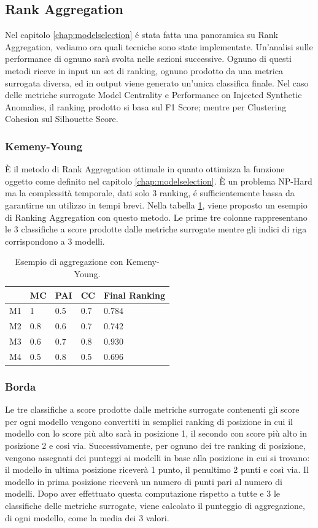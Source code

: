 \subsection{Rank Aggregation}
Nel capitolo \ref{chap:modelselection} é stata fatta una panoramica su Rank Aggregation, vediamo ora quali tecniche sono state implementate. Un'analisi sulle performance di ognuno sarà svolta nelle sezioni successive.
Ognuno di questi metodi riceve in input un set di ranking, ognuno prodotto da una metrica surrogata diversa, ed in output viene generato un'unica classifica finale.
Nel caso delle metriche surrogate Model Centrality e Performance on Injected Synthetic Anomalies, il ranking prodotto si basa sul F1 Score; mentre per Clustering Cohesion sul Silhouette Score.
\subsubsection{Kemeny-Young}
È il metodo di Rank Aggregation ottimale in quanto ottimizza la funzione oggetto come definito nel capitolo \ref{chap:modelselection}. È un problema NP-Hard ma la complessità temporale, dati solo 3 ranking, é sufficientemente bassa da garantirne un utilizzo in tempi brevi. Nella tabella \ref{kemeny-young}, viene proposto un esempio di Ranking Aggregation con questo metodo. Le prime tre colonne rappresentano le 3 classifiche a score prodotte dalle metriche surrogate mentre gli indici di riga corrispondono a 3 modelli.
\begin{table}
	\centering
	\caption{\label{kemeny-young}Esempio di aggregazione con Kemeny-Young.}
	\begin{tabular}{|l|l|l|l|l|} 
		\hline
		   & MC  & PAI & CC  & Final Ranking \\ 
		\hline
		M1 & 1   & 0.5 & 0.7 & 0.784         \\ 
		\hline
		M2 & 0.8 & 0.6 & 0.7 & 0.742         \\ 
		\hline
		M3 & 0.6 & 0.7 & 0.8 & 0.930         \\ 
		\hline
		M4 & 0.5 & 0.8 & 0.5 & 0.696         \\
		\hline
	\end{tabular}
\end{table}

\subsubsection{Borda}
Le tre classifiche a score prodotte dalle metriche surrogate contenenti gli score per ogni modello vengono convertiti in semplici ranking di posizione in cui il modello con lo score più alto sarà in posizione 1, il secondo con score più alto in posizione 2 e cosi via. 
Successivamente, per ognuno dei tre ranking di posizione, vengono assegnati dei punteggi ai modelli in base alla posizione in cui si trovano: il modello in ultima posizione riceverà 1 punto, il penultimo 2 punti e così via. Il modello in prima posizione riceverà un numero di punti pari al numero di modelli. 
Dopo aver effettuato questa computazione rispetto a tutte e 3 le classifiche delle metriche surrogate, viene calcolato il punteggio di aggregazione, di ogni modello, come la media dei 3 valori.

